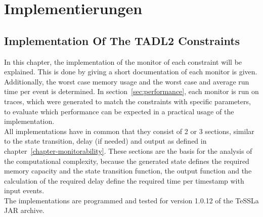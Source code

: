 
\chapter{Implementierungen}
\label{chapter-implementation}
	\section{Implementation Of The TADL2 Constraints}
	In this chapter, the implementation of the monitor of each constraint will be explained. This is done by giving a short documentation of each monitor is given. Additionally, the worst case memory usage and the worst case and average run time per event is determined. In section~\ref{sec:performance}, each monitor is run on traces, which were generated to match the constraints with specific parameters, to evaluate which performance can be expected in a practical usage of the implementation.\\
	All implementations have in common that they consist of 2 or 3 sections, similar to the state transition, delay (if needed) and output as defined in chapter~\ref{chapter-monitorability}. These sections are the basis for the analysis of the computational complexity, because the generated state defines the required memory capacity and the state transition function, the output function and the calculation of the required delay define the required time per timestamp with input events.\\
	The implementations are programmed and tested for version 1.0.12 of the TeSSLa JAR archive.
	 
